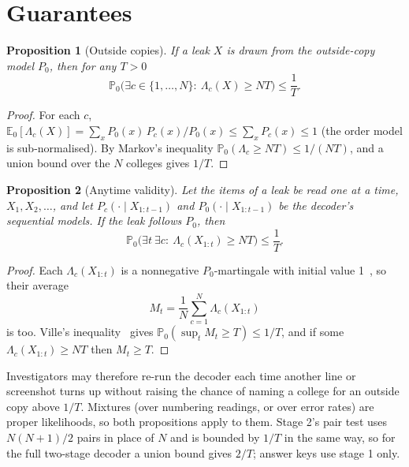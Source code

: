 \documentclass[10pt,a4paper]{article}
\newtheorem{proposition}{Proposition}
\theoremstyle{remark}
\newcommand{\pr}{\mathbb{P}}
\newcommand{\E}{\mathbb{E}}
\begin{document}
\section{Guarantees}
\label{sec:guarantee}

\begin{proposition}[Outside copies]\label{prop:outside}
If a leak $X$ is drawn from the outside-copy model $P_0$, then for any $T>0$
\[
\pr_0\Big(\exists c\in\{1,\dots,N\}:\ \Lambda_c(X)\ge NT\Big)\le\frac1T .
\]
\end{proposition}
\begin{proof}
For each $c$, $\E_0[\Lambda_c(X)]=\sum_x P_0(x)\,P_c(x)/P_0(x)\le\sum_x P_c(x)\le1$ (the order model is sub-normalised). By Markov's inequality $\pr_0(\Lambda_c\ge NT)\le 1/(NT)$, and a union bound over the $N$ colleges gives $1/T$.
\end{proof}

\begin{proposition}[Anytime validity]\label{prop:anytime}
Let the items of a leak be read one at a time, $X_1,X_2,\dots$, and let $P_c(\cdot\mid X_{1:t-1})$ and $P_0(\cdot\mid X_{1:t-1})$ be the decoder's sequential models. If the leak follows $P_0$, then
\[
\pr_0\Big(\exists t\ \exists c:\ \Lambda_c(X_{1:t})\ge NT\Big)\le\frac1T .
\]
\end{proposition}
\begin{proof}
Each $\Lambda_c(X_{1:t})$ is a nonnegative $P_0$-martingale with initial value 1~\citep{ramdas2023}, so their average
\[ M_t=\frac1N\sum_{c=1}^{N}\Lambda_c(X_{1:t}) \]
is too. Ville's inequality~\citep{ville1939} gives $\pr_0(\sup_t M_t\ge T)\le 1/T$, and if some $\Lambda_c(X_{1:t})\ge NT$ then $M_t\ge T$.
\end{proof}

\noindent Investigators may therefore re-run the decoder each time another line or screenshot turns up without raising the chance of naming a college for an outside copy above $1/T$. Mixtures (over numbering readings, or over error rates) are proper likelihoods, so both propositions apply to them. Stage 2's pair test uses $N(N+1)/2$ pairs in place of $N$ and is bounded by $1/T$ in the same way, so for the full two-stage decoder a union bound gives $2/T$; answer keys use stage 1 only.
\end{document}
